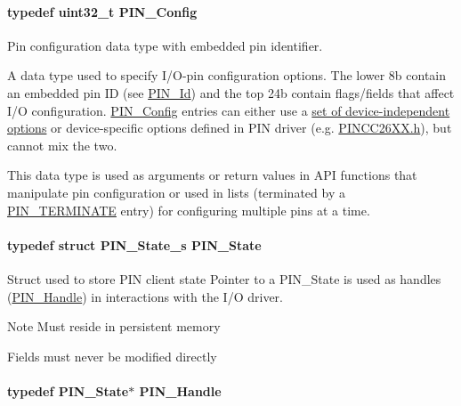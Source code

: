 \paragraph[{P\+I\+N\+\_\+\+Config}]{\setlength{\rightskip}{0pt plus 5cm}typedef uint32\+\_\+t {\bf P\+I\+N\+\_\+\+Config}}\label{_p_i_n_8h_ae427b7d2925f9b0f3145e455cfdb5841}


Pin configuration data type with embedded pin identifier. 

A data type used to specify I/\+O-\/pin configuration options. The lower 8b contain an embedded pin I\+D (see \hyperlink{_p_i_n_8h_a9ae8197f460bb76ea09a84f47d09921f}{P\+I\+N\+\_\+\+Id}) and the top 24b contain flags/fields that affect I/\+O configuration. \hyperlink{_p_i_n_8h_ae427b7d2925f9b0f3145e455cfdb5841}{P\+I\+N\+\_\+\+Config} entries can either use a \hyperlink{_p_i_n_8h_PIN_GENERIC_FLAGS}{set of device-\/independent options} or device-\/specific options defined in P\+I\+N driver (e.\+g. \hyperlink{_p_i_n_c_c26_x_x_8h}{P\+I\+N\+C\+C26\+X\+X.\+h}), but cannot mix the two.

This data type is used as arguments or return values in A\+P\+I functions that manipulate pin configuration or used in lists (terminated by a \hyperlink{_p_i_n_8h_ae22ec44ad92ee130a665ca56aad38c75}{P\+I\+N\+\_\+\+T\+E\+R\+M\+I\+N\+A\+T\+E} entry) for configuring multiple pins at a time. 
\paragraph[{P\+I\+N\+\_\+\+State}]{\setlength{\rightskip}{0pt plus 5cm}typedef struct {\bf P\+I\+N\+\_\+\+State\+\_\+s} {\bf P\+I\+N\+\_\+\+State}}\label{_p_i_n_8h_a36ef69d50df6baa6973482669c24a522}


Struct used to store P\+I\+N client state Pointer to a P\+I\+N\+\_\+\+State is used as handles (\hyperlink{_p_i_n_8h_afb2de52b054638f63c39df1f30a0d88d}{P\+I\+N\+\_\+\+Handle}) in interactions with the I/\+O driver. 

\begin{DoxyNote}{Note}
Must reside in persistent memory 

Fields must never be modified directly 
\end{DoxyNote}
\paragraph[{P\+I\+N\+\_\+\+Handle}]{\setlength{\rightskip}{0pt plus 5cm}typedef {\bf P\+I\+N\+\_\+\+State}$\ast$ {\bf P\+I\+N\+\_\+\+Handle}}\label{_p_i_n_8h_afb2de52b054638f63c39df1f30a0d88d}



